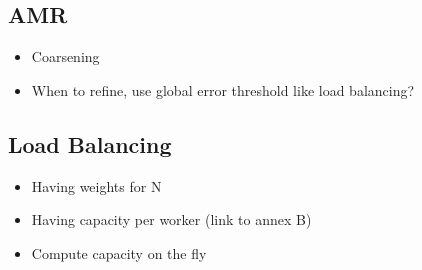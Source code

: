 \subsection{AMR}\label{subsection:conclusion:future_work:amr}

\begin{itemize}
    \item Coarsening
    \item When to refine, use global error threshold like load balancing?
\end{itemize}

\subsection{Load Balancing}\label{subsection:conclusion:future_work:load_balancing}

\begin{itemize}
    \item Having weights for N
    \item Having capacity per worker (link to annex B)
    \item Compute capacity on the fly
\end{itemize}
